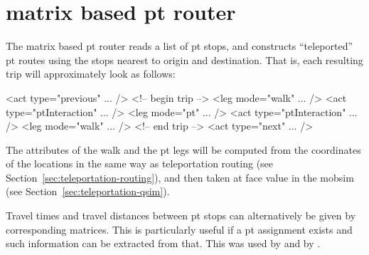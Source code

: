 %


\section{matrix based pt router}
\label{sec:matrix-based-pt-router}

The matrix based \gls{pt} router reads a list of \gls{pt} stops, and constructs ``teleported'' \gls{pt} routes using the stops nearest to origin and destination.  That is, each resulting trip will approximately look as follows:
\begin{xml}
<act type="previous" ... />
<!-- begin trip -->
<leg mode="walk" ... />
<act type="ptInteraction" ... />
<leg mode="pt" ... />
<act type="ptInteraction" ... />
<leg mode="walk" ... />
<!-- end trip -->
<act type="next" ... />  
\end{xml}

The attributes of the walk and the \gls{pt} legs will be computed from the coordinates of the locations in the same way as teleportation routing (see Section~\ref{sec:teleportation-routing}), and then taken at face value in the \gls{mobsim} (see Section~\ref{sec:teleportation-qsim}).

Travel times and travel distances between \gls{pt} stops can alternatively be given by corresponding matrices.  This is particularly useful if a \gls{pt} assignment exists and such information can be extracted from that.  This was used by \citet{RoederNagel2013SketchPlanningBrussels} and by \citet{ZoelligRenner_PhDThesis_2014}.

